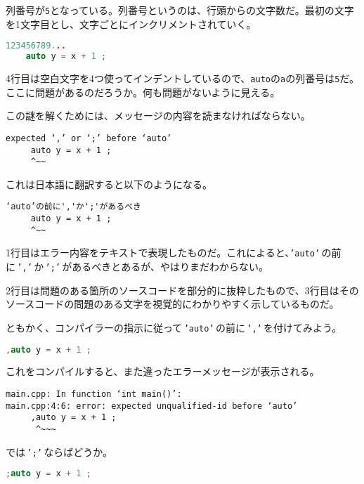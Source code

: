 列番号が\texttt{5}となっている。列番号というのは、行頭からの文字数だ。最初の文字を1文字目とし、文字ごとにインクリメントされていく。

\begin{lstlisting}[language=c++]
123456789...
    auto y = x + 1 ;
\end{lstlisting}

4行目は空白文字を4つ使ってインデントしているので、\texttt{auto}の\texttt{a}の列番号は\texttt{5}だ。ここに問題があるのだろうか。何も問題がないように見える。

この謎を解くためには、メッセージの内容を読まなければならない。

\begin{lstlisting}[style=terminal]
expected ‘,’ or ‘;’ before ‘auto’
     auto y = x + 1 ;
     ^~~
\end{lstlisting}

これは日本語に翻訳すると以下のようになる。

\begin{lstlisting}[style=terminal]
‘auto’の前に','か';'があるべき
     auto y = x + 1 ;
     ^~~
\end{lstlisting}

1行目はエラー内容をテキストで表現したものだ。これによると、\texttt{'auto'}\,の前に\,\texttt{','}\,か\,\texttt{';'}\,があるべきとあるが、やはりまだわからない。

2行目は問題のある箇所のソースコードを部分的に抜粋したもので、3行目はそのソースコードの問題のある文字を視覚的にわかりやすく示しているものだ。

ともかく、コンパイラーの指示に従って\,\texttt{'auto'}\,の前に\,\texttt{','}\,を付けてみよう。

\begin{lstlisting}[language=c++]
    ,auto y = x + 1 ;
\end{lstlisting}

これをコンパイルすると、また違ったエラーメッセージが表示される。

\begin{lstlisting}[style=terminal]
main.cpp: In function ‘int main()’:
main.cpp:4:6: error: expected unqualified-id before ‘auto’
     ,auto y = x + 1 ;
      ^~~~
\end{lstlisting}

では\,\texttt{';'}\,ならばどうか。

\begin{lstlisting}[language=c++]
    ;auto y = x + 1 ;
\end{lstlisting}

